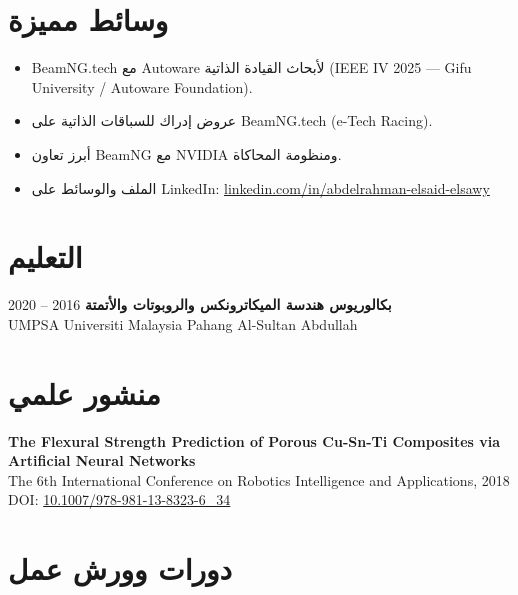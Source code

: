\documentclass[11pt,a4paper]{article}
\newcommand{\en}[1]{\textenglish{#1}}
\begin{document}
\section*{وسائط مميزة}

\begin{itemize}
    \item \en{BeamNG.tech} مع \en{Autoware} لأبحاث القيادة الذاتية (\en{IEEE IV 2025} — \en{Gifu University / Autoware Foundation}).
    \item عروض إدراك للسباقات الذاتية على \en{BeamNG.tech} (\en{e-Tech Racing}).
    \item أبرز تعاون \en{BeamNG} مع \en{NVIDIA} ومنظومة المحاكاة.
    \item الملف والوسائط على \en{LinkedIn}: \href{https://www.linkedin.com/in/abdelrahman-elsaid-elsawy}{\en{linkedin.com/in/abdelrahman-elsaid-elsawy}}
\end{itemize}

\section*{التعليم}

\textbf{بكالوريوس هندسة الميكاترونكس والروبوتات والأتمتة}
\hfill 2016 -- 2020\\
\en{UMPSA Universiti Malaysia Pahang Al-Sultan Abdullah}

\section*{منشور علمي}

\textbf{\en{The Flexural Strength Prediction of Porous Cu-Sn-Ti Composites via Artificial Neural Networks}}\\
\en{The 6th International Conference on Robotics Intelligence and Applications, 2018}\\
\en{DOI:} \href{https://doi.org/10.1007/978-981-13-8323-6_34}{\en{10.1007/978-981-13-8323-6\_34}}

\section*{دورات وورش عمل}
\end{document}
